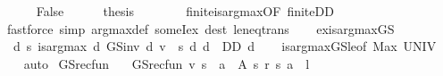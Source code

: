 \begin{isabellebody}
\ \ \ \ \isamarkupfalse%
\ False\isanewline
\ \ \ \ \isamarkupfalse%
\ {\isacharquery}{\kern0pt}thesis\isanewline
\ \ \ \ \ \ \isamarkupfalse%
\ finite{\isacharunderscore}{\kern0pt}is{\isacharunderscore}{\kern0pt}arg{\isacharunderscore}{\kern0pt}max{\isacharbrackleft}{\kern0pt}OF\ finite{\isacharunderscore}{\kern0pt}D\isactrlsub D{\isacharbrackright}{\kern0pt}\ \isanewline
\ \ \ \ \ \ \isamarkupfalse%
\ {\isacharparenleft}{\kern0pt}fastforce\ simp{\isacharcolon}{\kern0pt}\ arg{\isacharunderscore}{\kern0pt}max{\isacharunderscore}{\kern0pt}def\ someI{\isacharunderscore}{\kern0pt}ex\ dest{\isacharbang}{\kern0pt}{\isacharcolon}{\kern0pt}\ le{\isacharunderscore}{\kern0pt}neq{\isacharunderscore}{\kern0pt}trans{\isacharparenright}{\kern0pt}\isanewline
\ \ \isamarkupfalse%
\isanewline
{}\isamarkupfalse%
%
\endisatagproof
{\isafoldproof}%
%
\isadelimproof
\isanewline
%
\endisadelimproof
\isanewline
{}\isamarkupfalse%
\ ex{\isacharunderscore}{\kern0pt}is{\isacharunderscore}{\kern0pt}arg{\isacharunderscore}{\kern0pt}max{\isacharunderscore}{\kern0pt}GS{\isacharcolon}{\kern0pt}\ \isanewline
\ \ {\isachardoublequoteopen}{\isasymexists}d{\isachardot}{\kern0pt}\ {\isasymforall}s{\isachardot}{\kern0pt}\ is{\isacharunderscore}{\kern0pt}arg{\isacharunderscore}{\kern0pt}max\ {\isacharparenleft}{\kern0pt}{\isasymlambda}d{\isachardot}{\kern0pt}\ GS{\isacharunderscore}{\kern0pt}inv\ d\ v\ {\isachardollar}{\kern0pt}\ s{\isacharparenright}{\kern0pt}\ {\isacharparenleft}{\kern0pt}{\isasymlambda}d{\isachardot}{\kern0pt}\ d\ {\isasymin}\ D\isactrlsub D{\isacharparenright}{\kern0pt}\ d{\isachardoublequoteclose}\isanewline
%
\isadelimproof
\ \ %
\endisadelimproof
%
\isatagproof
{}\isamarkupfalse%
\ is{\isacharunderscore}{\kern0pt}arg{\isacharunderscore}{\kern0pt}max{\isacharunderscore}{\kern0pt}GS{\isacharunderscore}{\kern0pt}le{\isacharbrackleft}{\kern0pt}of\ {\isachardoublequoteopen}Max\ UNIV{\isachardoublequoteclose}{\isacharbrackright}{\kern0pt}\ \ \isanewline
\ \ \isamarkupfalse%
\ auto%
\endisatagproof
{\isafoldproof}%
%
\isadelimproof
\isanewline
%
\endisadelimproof
\isanewline
{}\isamarkupfalse%
\ GS{\isacharunderscore}{\kern0pt}rec{\isacharunderscore}{\kern0pt}fun\ \isanewline
\ \ {\isachardoublequoteopen}GS{\isacharunderscore}{\kern0pt}rec{\isacharunderscore}{\kern0pt}fun\ v\ s\ {\isacharequal}{\kern0pt}\ {\isacharparenleft}{\kern0pt}{\isasymSqunion}a\ {\isasymin}\ A\ s{\isachardot}{\kern0pt}\ r\ {\isacharparenleft}{\kern0pt}s{\isacharcomma}{\kern0pt}\ a{\isacharparenright}{\kern0pt}\ {\isacharplus}{\kern0pt}\ l\ {\isacharasterisk}{\kern0pt}\ {\isacharparenleft}{\kern0pt}\isanewline

\end{isabellebody}
